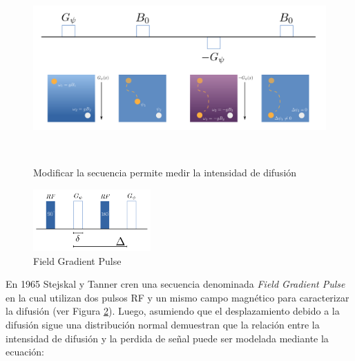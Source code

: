 \vspace{0.1cm}

\begin{figure}
                                                                                                                        
\begin{minipage}[b]{\textwidth}
    \includegraphics[width=\textwidth]{img/dmri.png}
    \caption{Modificar la secuencia permite medir la intensidad de difusi\'on}
    \label{fig:dmri}
\end{minipage} ~

\end{figure}  

\begin{figure}
    \begin{center}
        \includegraphics[width=0.4\textwidth]{img/fgp.png}
        \caption{Field Gradient Pulse}
        \label{fig:fgp}
    \end{center}
\end{figure}  

En 1965 Stejskal y Tanner \cite{Stejskal1965} cren una secuencia denominada 
\textit{Field Gradient Pulse} en la cual utilizan dos pulsos RF y un mismo campo
magn\'etico para caracterizar la difusi\'on (ver Figura \ref{fig:fgp}). Luego, 
asumiendo que el desplazamiento debido a la difusi\'on sigue una distribuci\'on 
normal demuestran que la relaci\'on entre la intensidad de difusi\'on y la perdida de
se\~nal puede ser modelada mediante la ecuaci\'on:

\vspace{0.3cm}

